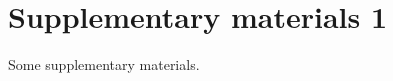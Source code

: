 \documentclass[
  a4paper,
  DIV=11,
  numbers=noendperiod]{scrreprt}
\begin{document}
\cleardoublepage
{}
{}
\appendix

\chapter{Supplementary materials 1}\label{supplementary-materials-1}

Some supplementary materials.
\end{document}
